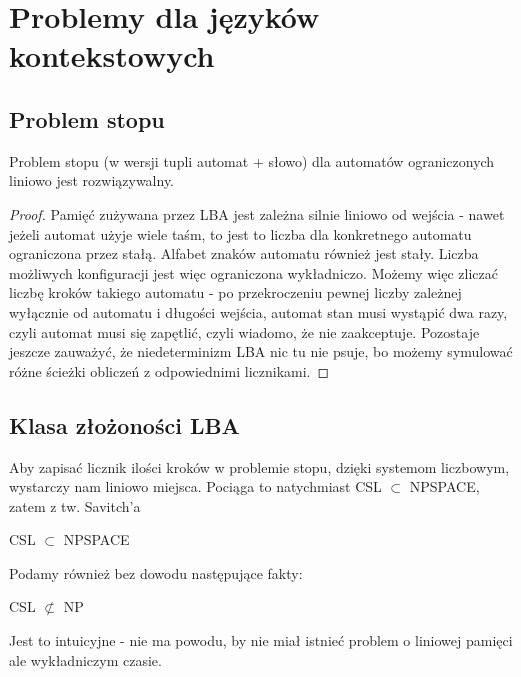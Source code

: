 \section{Problemy dla języków kontekstowych}

\subsection{Problem stopu}

\begin{lemma}
    Problem stopu (w wersji tupli automat + słowo) dla automatów ograniczonych liniowo jest rozwiązywalny.
\end{lemma}

\begin{proof}
    Pamięć zużywana przez LBA jest zależna silnie liniowo od wejścia - nawet jeżeli automat użyje wiele taśm, to jest to liczba dla konkretnego automatu ograniczona przez stałą.
    Alfabet znaków automatu również jest stały. Liczba możliwych konfiguracji jest więc ograniczona wykładniczo. Możemy więc zliczać liczbę kroków takiego automatu - po
    przekroczeniu pewnej liczby zależnej wyłącznie od automatu i długości wejścia, automat stan musi wystąpić dwa razy, czyli automat musi się zapętlić, czyli wiadomo, że nie zaakceptuje.
    Pozostaje jeszcze zauważyć, że niedeterminizm LBA nic tu nie psuje, bo możemy symulować różne ścieżki obliczeń z odpowiednimi licznikami.
\end{proof}

\subsection{Klasa złożoności LBA}

Aby zapisać licznik ilości kroków w problemie stopu, dzięki systemom liczbowym, wystarczy nam liniowo miejsca. Pociąga to natychmiast CSL \(\subset\) NPSPACE, zatem z tw. Savitch'a

\begin{corollary}
    CSL \(\subset\) NPSPACE
\end{corollary}

Podamy również bez dowodu następujące fakty:

\begin{lemma}
    CSL \( \not \subset \) NP
\end{lemma}

Jest to intuicyjne - nie ma powodu, by nie miał istnieć problem o liniowej pamięci ale wykładniczym czasie.

